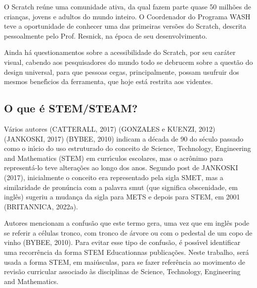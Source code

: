 \documentclass[
12pt,		%
openright,	%
twoside,  %
a4paper,			%
chapter=TITLE,		%
english,			%
french,				%
spanish,			%
brazil				%
]{USPSC-classe/USPSC}
\begin{document}
O Scratch re\'une uma comunidade ativa, da qual fazem parte quase 50 milh\~oes de crian\c{c}as, jovens e adultos do mundo inteiro. O Coordenador do Programa WASH teve a oportunidade de conhecer uma das primeiras vers\~oes do Scratch, descrita pessoalmente pelo Prof. Resnick, na \'epoca de seu desenvolvimento.









Ainda h\'a questionamentos sobre a acessibilidade do Scratch, por seu car\'ater visual, cabendo aos pesquisadores do mundo todo se debrucem sobre a quest\~ao do design universal, para que pessoas cegas, principalmente, possam usufruir dos mesmos benef\'{\i}cios da ferramenta, que hoje est\'a restrita aos videntes.









\subsection[O que \'e STEM/STEAM?]{O que \'e STEM/STEAM?}\label{O que \'e STEM/STEAM?}
V\'arios autores (CATTERALL, 2017)  (GONZALES e KUENZI, 2012)  (JANKOSKI, 2017)  (BYBEE, 2010) indicam a d\'ecada de 90 do s\'eculo passado como o in\'{\i}cio do uso estruturado do conceito de Science, Technology, Engineering and Mathematics (STEM) em curr\'{\i}culos escolares, mas o acr\^onimo para represent\'a-lo teve altera\c{c}\~oes ao longo dos anos. 
Segundo post de  JANKOSKI (2017), inicialmente o conceito era representado pela sigla SMET, mas a similaridade de pron\'uncia com a palavra \textquotedbl smut (que significa obscenidade, em ingl\^es) sugeriu a mudan\c{c}a da sigla para METS e depois para STEM, em 2001  (BRITANNICA, 2022a).









Autores mencionam a confus\~ao que este termo gera, uma vez que em ingl\^es pode se referir a c\'elulas tronco, com tronco de \'arvore ou com o pedestal de um copo de vinho  (BYBEE, 2010). Para evitar esse tipo de confus\~ao, \'e poss\'{\i}vel identificar uma recorr\^encia da forma \textquotedbl STEM Education\textquotedbl  nas publica\c{c}\~oes. Neste trabalho, ser\'a usada a forma STEM, em mai\'usculas, para se fazer refer\^encia ao movimento de revis\~ao curricular associado \`as disciplinas de \textquotedbl Science, Technology, Engineering and Mathematics.
\end{document}
